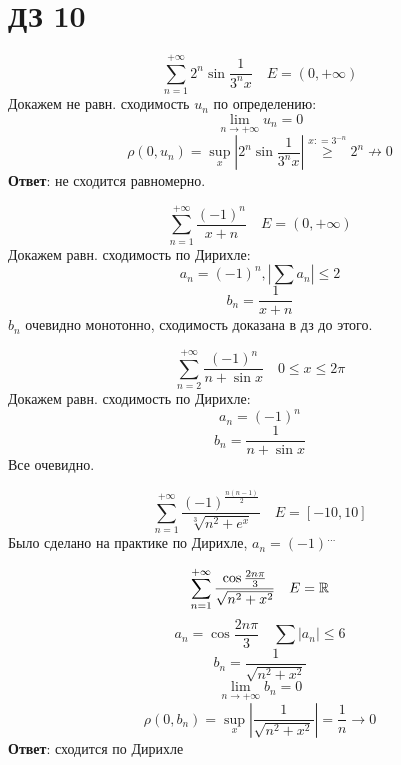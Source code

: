 \section*{ДЗ 10}


\begin{exercise}[2776]
    \[\sum_{n = 1}^{+\infty} 2^n \sin \frac{1}{3^nx} \quad E = (0, +\infty)\]
    Докажем не равн. сходимость \(u_n\) по определению:
    \[\lim_{n\to +\infty} u_n = 0\]
    \[\rho(0, u_n) = \sup_x \left|2^n \sin \frac{1}{3^nx}\right| \stackrel{x: = 3^{ -n}}{ \geq } 2^n \not \to 0\]
    \textbf{Ответ}: не сходится равномерно.
\end{exercise}

\begin{exercise}[2777]
    \[\sum_{n = 1}^{+\infty} \frac{( - 1)^n}{x + n} \quad E = (0, +\infty)\]
    Докажем равн. сходимость по Дирихле:
    \[a_n = ( - 1)^n, |\sum a_n| \leq 2\]
    \[b_n = \frac{1}{x + n}\]
    \(b_n\) очевидно монотонно, сходимость доказана в дз до этого.
\end{exercise}

\begin{exercise}[2778]
    \[\sum_{n = 2}^{+\infty} \frac{( - 1)^n}{n + \sin x} \quad 0 \leq x \leq 2\pi\]
    Докажем равн. сходимость по Дирихле:
    \[a_n =( - 1)^n\]
    \[b_n = \frac{1}{n + \sin x}\]
    Все очевидно.
\end{exercise}

\begin{exercise}[2779]
    \[\sum_{n = 1}^{+\infty} \frac{( - 1)^{\frac{n(n - 1)}{2} }}{\sqrt[3]{n^2 + e^x}} \quad E = [ - 10, 10] \]
    Было сделано на практике по Дирихле, \(a_n =( - 1)^{\dots }\)
\end{exercise}

\begin{exercise}[2780]
    \[\sum_{n = 1}^{+\infty} \frac{\cos \frac{2n \pi}{3} }{\sqrt{n^2 + x^2}} \quad E = \mathbb{R}\]
    \[a_n = \cos \frac{2n \pi}{3} \quad \sum \left|a_n\right| \leq 6\]
    \[b_n = \frac{1}{\sqrt{n^2 + x^2}}\]
    \[\lim_{n\to +\infty} b_n = 0\]
    \[\rho(0, b_n) = \sup_x \left|\frac{1}{\sqrt{n^2 + x^2}}\right| = \frac{1}{n}\to 0\]
    \textbf{Ответ}: сходится по Дирихле
\end{exercise}

